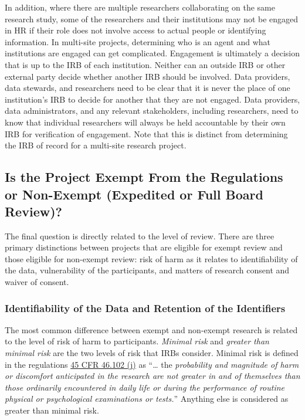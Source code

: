 In addition, where there are multiple researchers collaborating on the same research study, some of the researchers and their institutions may not be engaged in HR if their role does not involve access to actual people or identifying information. In multi-site projects, determining who is an agent and what institutions are engaged can get complicated. Engagement is ultimately a decision that is up to the IRB of each institution. Neither can an outside IRB or other external party decide whether another IRB should be involved. Data providers, data stewards, and researchers need to be clear that it is never the place of one institution's IRB to decide for another that they are not engaged. Data providers, data administrators, and any relevant stakeholders, including researchers, need to know that individual researchers will always be held accountable by their own IRB for verification of engagement. Note that this is distinct from determining the IRB of record for a multi-site research project.

\hypertarget{is-the-project-exempt-from-the-regulations-or-non-exempt-expedited-or-full-board-review}{%
\subsection{Is the Project Exempt From the Regulations or Non-Exempt (Expedited or Full Board Review)?}\label{is-the-project-exempt-from-the-regulations-or-non-exempt-expedited-or-full-board-review}}

The final question is directly related to the level of review. There are three primary distinctions between projects that are eligible for exempt review and those eligible for non-exempt review: risk of harm as it relates to identifiability of the data, vulnerability of the participants, and matters of research consent and waiver of consent.

\hypertarget{identifiability-of-the-data-and-retention-of-the-identifiers}{%
\subsubsection{Identifiability of the Data and Retention of the Identifiers}\label{identifiability-of-the-data-and-retention-of-the-identifiers}}

The most common difference between exempt and non-exempt research is related to the level of risk of harm to participants. \emph{Minimal risk} and \emph{greater than minimal risk} are the two levels of risk that IRBs consider. Minimal risk is defined in the regulations \href{https://www.law.cornell.edu/cfr/text/45/46.102}{45 CFR 46.102 (j)} as ``\ldots{} the \emph{probability and magnitude of harm or discomfort anticipated in the research are not greater in and of themselves than those ordinarily encountered in daily life or during the performance of routine physical or psychological examinations or tests.}'' Anything else is considered as greater than minimal risk.

